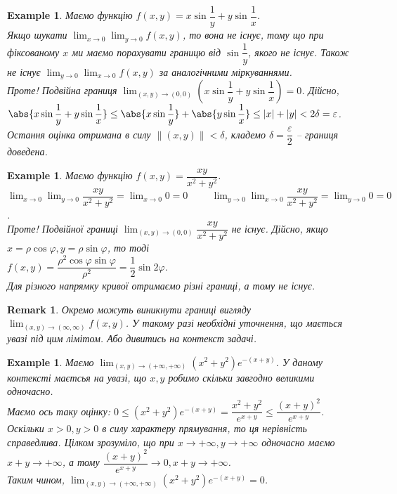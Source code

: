 \documentclass[a4paper, 10pt]{article}
\def\huge{\displaystyle}
\theoremstyle{theoremdd}
\theoremstyle{theoremdd}
\theoremstyle{theoremdd}
\theoremstyle{theoremdd}
\theoremstyle{theoremdd}
\newtheorem{example}[theorem]{Example}
\theoremstyle{theoremdd}
\theoremstyle{theoremdd}
\newtheorem{remark}[theorem]{Remark}
\theoremstyle{theoremdd}
\theoremstyle{theoremdd}
\newcommand\Norm[1]{\|#1\|}
\begin{document}
\begin{example}
Маємо функцію $f(x,y) = x \sin \dfrac{1}{y} + y \sin \dfrac{1}{x}$.\\
Якщо шукати $\huge\lim_{x \to 0} \lim_{y \to 0} f(x,y)$, то вона не існує, тому що при фіксованому $x$ ми маємо порахувати границю від $\sin \dfrac{1}{y}$, якого не існує. Також не існує $\huge\lim_{y \to 0} \lim_{x \to 0} f(x,y)$ за аналогічними міркуваннями.\\
Проте! Подвійна границя $\huge\lim_{(x,y) \to (0,0)} \left( x \sin \dfrac{1}{y} + y \sin \dfrac{1}{x} \right) = 0$. Дійсно,\\
$\abs{x \sin \dfrac{1}{y} + y \sin \dfrac{1}{x}} \leq \abs{x \sin \dfrac{1}{y}} + \abs{y \sin \dfrac{1}{x}} \leq |x| + |y| < 2 \delta = \varepsilon$.\\
Остання оцінка отримана в силу $\Norm{(x,y)} < \delta$, кладемо $\delta = \dfrac{\varepsilon}{2}$ -- границя доведена.
\end{example}

\begin{example}
Маємо функцію $f(x,y) = \dfrac{xy}{x^2+y^2}$.\\
$\huge\lim_{x \to 0} \lim_{y \to 0} \dfrac{xy}{x^2+y^2} = \lim_{x \to 0} 0 = 0 \hspace{1cm} \huge\lim_{y \to 0} \lim_{x \to 0} \dfrac{xy}{x^2+y^2} = \lim_{y \to 0} 0 = 0$.\\
Проте! Подвійної границі $\huge\lim_{(x,y) \to (0,0)} \dfrac{xy}{x^2+y^2}$ не існує. Дійсно, якщо $x = \rho \cos \varphi, y = \rho \sin \varphi$, то тоді\\
$f(x,y) = \dfrac{\rho^2 \cos \varphi \sin \varphi}{\rho^2} = \dfrac{1}{2} \sin 2 \varphi$.\\
Для різного напрямку кривої отримаємо різні границі, а тому не існує.
\end{example}

\begin{remark}
Окремо можуть виникнути границі вигляду $\displaystyle\lim_{(x,y) \to (\infty,\infty)} f(x,y)$. У такому разі необхідні уточнення, що мається увазі під цим лімітом. Або дивитись на контекст задачі.
\end{remark}

\begin{example}
Маємо $\displaystyle\lim_{(x,y) \to (+\infty,+\infty)} (x^2+y^2) e^{-(x+y)}$. У даному контексті маєтсья на увазі, що $x,y$ робимо скільки завгодно великими одночасно.\\
Маємо ось таку оцінку: $0 \leq (x^2+y^2)e^{-(x+y)} = \dfrac{x^2+y^2}{e^{x+y}} \leq \dfrac{(x+y)^2}{e^{x+y}}$.\\
Оскільки $x>0,y>0$ в силу характеру прямування, то ця нерівність справедлива. Цілком зрозуміло, що при $x \to +\infty, y \to +\infty$ одночасно маємо $x+y \to +\infty$, а тому $\dfrac{(x+y)^2}{e^{x+y}} \to 0, x+y \to +\infty$.\\
Таким чином, $\displaystyle\lim_{(x,y) \to (+\infty,+\infty)} (x^2+y^2) e^{-(x+y)} = 0$.
\end{example}
\end{document}
